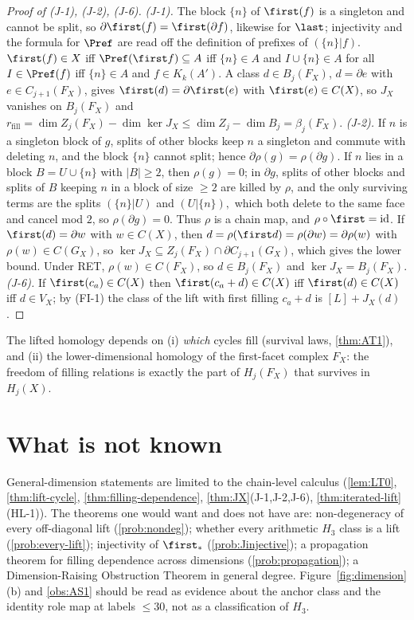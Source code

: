 \begin{proof}[Proof of (J-1), (J-2), (J-6)]
\emph{(J-1).} The block $\{n\}$ of $\first(f)$ is a singleton and cannot be split, so $\partial\first(f)=\first(\partial f)$, likewise for $\last$; injectivity and the formula for $\Pref$ are read off the definition of prefixes of $(\{n\}|f)$. $\first(f)\in X$ iff $\Pref(\first f)\subseteq A$ iff $\{n\}\in A$ and $I\cup\{n\}\in A$ for all $I\in\Pref(f)$ iff $\{n\}\in A$ and $f\in K_k(A')$. A class $d\in B_j(F_X)$, $d=\partial e$ with $e\in C_{j+1}(F_X)$, gives $\first(d)=\partial\first(e)$ with $\first(e)\in C(X)$, so $J_X$ vanishes on $B_j(F_X)$ and $r_{\mathrm{fill}}=\dim Z_j(F_X)-\dim\ker J_X\le\dim Z_j-\dim B_j=\beta_j(F_X)$.
\emph{(J-2).} If $n$ is a singleton block of $g$, splits of other blocks keep $n$ a singleton and commute with deleting $n$, and the block $\{n\}$ cannot split; hence $\partial\rho(g)=\rho(\partial g)$. If $n$ lies in a block $B=U\cup\{n\}$ with $|B|\ge2$, then $\rho(g)=0$; in $\partial g$, splits of other blocks and splits of $B$ keeping $n$ in a block of size $\ge2$ are killed by $\rho$, and the only surviving terms are the splits $(\{n\}|U)$ and $(U|\{n\}),$ which both delete to the same face and cancel mod $2$, so $\rho(\partial g)=0$. Thus $\rho$ is a chain map, and $\rho\circ\first=\mathrm{id}$. If $\first(d)=\partial w$ with $w\in C(X)$, then $d=\rho(\first d)=\rho(\partial w)=\partial\rho(w)$ with $\rho(w)\in C(G_X)$, so $\ker J_X\subseteq Z_j(F_X)\cap\partial C_{j+1}(G_X)$, which gives the lower bound. Under RET, $\rho(w)\in C(F_X)$, so $d\in B_j(F_X)$ and $\ker J_X=B_j(F_X)$.
\emph{(J-6).} If $\first(c_a)\in C(X)$ then $\first(c_a+d)\in C(X)$ iff $\first(d)\in C(X)$ iff $d\in V_X$; by (FI-1) the class of the lift with first filling $c_a+d$ is $[L]+J_X(d)$.
\end{proof}
\begin{remark}
The lifted homology depends on (i) \emph{which} cycles fill (survival laws, \cref{thm:AT1}), and (ii) the lower-dimensional homology of the first-facet complex $F_X$: the freedom of filling relations is exactly the part of $H_j(F_X)$ that survives in $H_j(X)$.
\end{remark}

\section{What is not known}
General-dimension statements are limited to the chain-level calculus (\cref{lem:LT0}, \cref{thm:lift-cycle}, \cref{thm:filling-dependence}, \cref{thm:JX}(J-1,J-2,J-6), \cref{thm:iterated-lift}(HL-1)). The theorems one would want and does not have are: non-degeneracy of every off-diagonal lift (\cref{prob:nondeg}); whether every arithmetic $H_3$ class is a lift (\cref{prob:every-lift}); injectivity of $\first_\ast$ (\cref{prob:Jinjective}); a propagation theorem for filling dependence across dimensions (\cref{prob:propagation}); a Dimension-Raising Obstruction Theorem in general degree. Figure~\ref{fig:dimension}(b) and \cref{obs:AS1} should be read as evidence about the anchor class and the identity role map at labels $\le30$, not as a classification of $H_3$.
